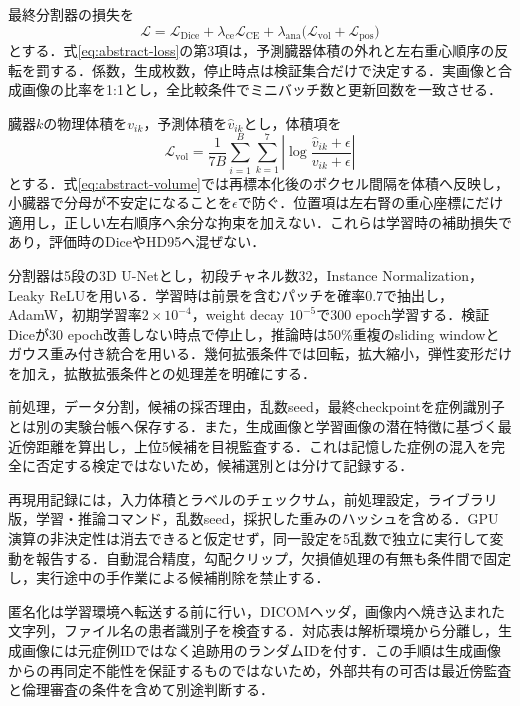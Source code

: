 最終分割器の損失を
\begin{equation}
  \mathcal{L}=\mathcal{L}_{\mathrm{Dice}}
  +\lambda_{\mathrm{ce}}\mathcal{L}_{\mathrm{CE}}
  +\lambda_{\mathrm{ana}}
    \bigl(\mathcal{L}_{\mathrm{vol}}+\mathcal{L}_{\mathrm{pos}}\bigr)
  \label{eq:abstract-loss}
\end{equation}
とする．式\eqref{eq:abstract-loss}の第3項は，予測臓器体積の外れと左右重心順序の反転を罰する．係数，生成枚数，停止時点は検証集合だけで決定する．実画像と合成画像の比率を1:1とし，全比較条件でミニバッチ数と更新回数を一致させる．

臓器$k$の物理体積を$v_{ik}$，予測体積を$\hat{v}_{ik}$とし，体積項を
\begin{equation}
  \mathcal{L}_{\mathrm{vol}}
  =\frac{1}{7B}\sum_{i=1}^{B}\sum_{k=1}^{7}
  \left|\log\frac{\hat{v}_{ik}+\epsilon}{v_{ik}+\epsilon}\right|
  \label{eq:abstract-volume}
\end{equation}
とする．式\eqref{eq:abstract-volume}では再標本化後のボクセル間隔を体積へ反映し，小臓器で分母が不安定になることを$\epsilon$で防ぐ．位置項は左右腎の重心座標にだけ適用し，正しい左右順序へ余分な拘束を加えない．これらは学習時の補助損失であり，評価時のDiceやHD95へ混ぜない．

分割器は5段の3D U-Netとし，初段チャネル数32，Instance Normalization，Leaky ReLUを用いる．学習時は前景を含むパッチを確率0.7で抽出し，AdamW，初期学習率$2\times10^{-4}$，weight decay $10^{-5}$で300 epoch学習する．検証Diceが30 epoch改善しない時点で停止し，推論時は50\%重複のsliding windowとガウス重み付き統合を用いる．幾何拡張条件では回転，拡大縮小，弾性変形だけを加え，拡散拡張条件との処理差を明確にする．

前処理，データ分割，候補の採否理由，乱数seed，最終checkpointを症例識別子とは別の実験台帳へ保存する．また，生成画像と学習画像の潜在特徴に基づく最近傍距離を算出し，上位5候補を目視監査する．これは記憶した症例の混入を完全に否定する検定ではないため，候補選別とは分けて記録する．

再現用記録には，入力体積とラベルのチェックサム，前処理設定，ライブラリ版，学習・推論コマンド，乱数seed，採択した重みのハッシュを含める．GPU演算の非決定性は消去できると仮定せず，同一設定を5乱数で独立に実行して変動を報告する．自動混合精度，勾配クリップ，欠損値処理の有無も条件間で固定し，実行途中の手作業による候補削除を禁止する．

匿名化は学習環境へ転送する前に行い，DICOMヘッダ，画像内へ焼き込まれた文字列，ファイル名の患者識別子を検査する．対応表は解析環境から分離し，生成画像には元症例IDではなく追跡用のランダムIDを付す．この手順は生成画像からの再同定不能性を保証するものではないため，外部共有の可否は最近傍監査と倫理審査の条件を含めて別途判断する．

